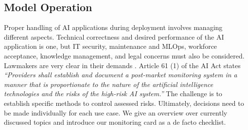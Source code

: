 \pagebreak
\subsection{Model Operation}
\label{subsec:monitoring}
Proper handling of AI applications during deployment involves managing different aspects. Technical correctness and desired performance of the AI application is one, but IT security, maintenance and MLOps, workforce acceptance, knowledge management, and legal concerns must also be considered. Lawmakers are very clear in their demands \citep{AiAct, EU2019_Ethic}. Article 61 (1) of the AI Act states \emph{``Providers shall establish and document a post-market monitoring system in a manner
that is proportionate to the nature of the artificial intelligence technologies and the
risks of the high-risk AI system.''} The challenge is to establish specific methods to control assessed risks. Ultimately, decisions need to be made individually for each use case. We give an overview over currently discussed topics and introduce our monitoring card as a de facto checklist. 

